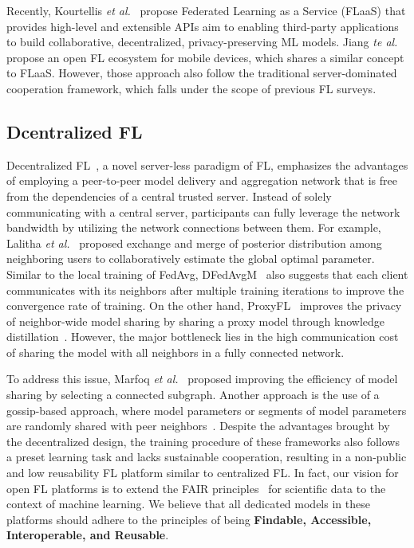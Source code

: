 Recently, Kourtellis \textit{et al.}~\cite{kourtellis2020flaas} propose Federated Learning as a Service (FLaaS) that provides high-level and extensible APIs aim to enabling third-party applications to build collaborative, decentralized, privacy-preserving ML models.
Jiang \textit{te al.}~\cite{jiang2022flsys} propose an open FL ecosystem for mobile devices, which shares a similar concept to FLaaS.
However, those approach also follow the traditional server-dominated cooperation framework, which falls under the scope of previous FL surveys\cite{yang2019federated, li2020federated,kairouz2021advances}.

\subsection{Dcentralized FL}
Decentralized FL~\cite{lalitha2018fully, kalra2023decentralized, marfoq2020throughput, hu2019decentralized, sun2022decentralized, shi2023improving}, a novel server-less paradigm of FL, emphasizes the advantages of employing a peer-to-peer model delivery and aggregation network that is free from the dependencies of a central trusted server.
Instead of solely communicating with a central server, participants can fully leverage the network bandwidth by utilizing the network connections between them.
For example, Lalitha \textit{et al.}~\cite{lalitha2018fully} proposed exchange and merge of posterior distribution among neighboring users to collaboratively estimate the global optimal parameter.
Similar to the local training of FedAvg, DFedAvgM~\cite{sun2022decentralized} also suggests that each client communicates with its neighbors after multiple training iterations to improve the convergence rate of training.
On the other hand, ProxyFL~\cite{kalra2023decentralized} improves the privacy of neighbor-wide model sharing by sharing a proxy model through knowledge distillation~\cite{hinton2015distilling}.
However, the major bottleneck lies in the high communication cost of sharing the model with all neighbors in a fully connected network. 

To address this issue, Marfoq \textit{et al.}~\cite{marfoq2020throughput} proposed improving the efficiency of model sharing by selecting a connected subgraph.
Another approach is the use of a gossip-based approach, where model parameters or segments of model parameters are randomly shared with peer neighbors~\cite{hegedHus2021decentralized, hu2019decentralized, shi2023improving}.
Despite the advantages brought by the decentralized design, the training procedure of these frameworks also follows a preset learning task and lacks sustainable cooperation, resulting in a non-public and low reusability FL platform similar to centralized FL.
In fact, our vision for open FL platforms is to extend the FAIR principles~\cite{wilkinson2016fair} for scientific data to the context of machine learning.
We believe that all dedicated models in these platforms should adhere to the principles of being \textbf{Findable, Accessible, Interoperable, and Reusable}.

